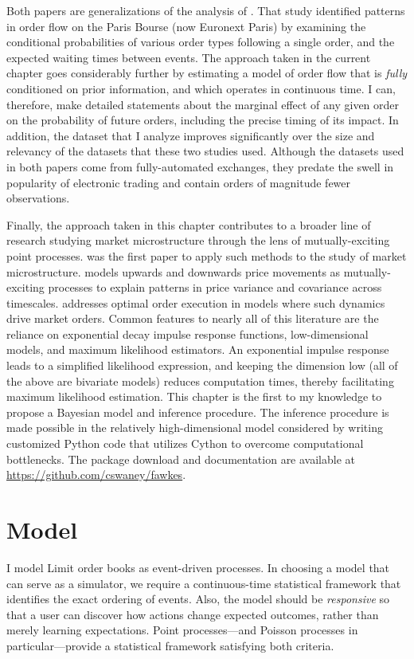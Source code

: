 		Both papers are generalizations of the analysis of \cite{Biais1995}. That study identified patterns in order flow on the Paris Bourse (now Euronext Paris) by examining the conditional probabilities of various order types following a single order, and the expected waiting times between events. The approach taken in the current chapter goes considerably further by estimating a model of order flow that is \textit{fully} conditioned on prior information, and which operates in continuous time. I can, therefore, make detailed statements about the marginal effect of any given order on the probability of future orders, including the precise timing of its impact. In addition, the dataset that I analyze improves significantly over the size and relevancy of the datasets that these two studies used. Although the datasets used in both papers come from fully-automated exchanges, they predate the swell in popularity of electronic trading and contain orders of magnitude fewer observations.

		Finally, the approach taken in this chapter contributes to a broader line of research studying market microstructure through the lens of mutually-exciting point processes. \cite{Bowsher2007} was the first paper to apply such methods to the study of market microstructure. \cite{Bacry2013} models upwards and downwards price movements as mutually-exciting processes to explain patterns in price variance and covariance across timescales. \cite{Alfonsi2016} addresses optimal order execution in models where such dynamics drive market orders. Common features to nearly all of this literature are the reliance on exponential decay impulse response functions, low-dimensional models, and maximum likelihood estimators. An exponential impulse response leads to a simplified likelihood expression, and keeping the dimension low (all of the above are bivariate models) reduces computation times, thereby facilitating maximum likelihood estimation. This chapter is the first to my knowledge to propose a Bayesian model and inference procedure. The inference procedure is made possible in the relatively high-dimensional model considered by writing customized Python code that utilizes Cython to overcome computational bottlenecks. The package download and documentation are available at \url{https://github.com/cswaney/fawkes}.


\section{Model}
	I model Limit order books as event-driven processes. In choosing a model that can serve as a simulator, we require a continuous-time statistical framework that identifies the exact ordering of events. Also, the model should be \textit{responsive} so that a user can discover how actions change expected outcomes, rather than merely learning expectations. Point processes---and Poisson processes in particular---provide a statistical framework satisfying both criteria.

